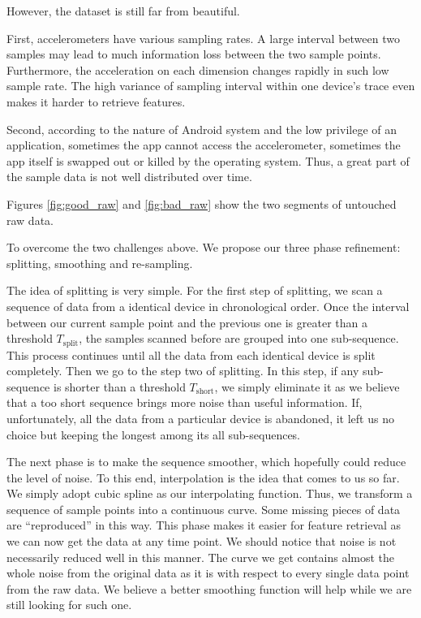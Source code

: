 \documentclass{article} %
\begin{document}
However, the dataset is still far from beautiful.

First, accelerometers have various sampling rates. A large interval between two samples may lead to much information loss between the two sample points. Furthermore, the acceleration on each dimension changes rapidly in such low sample rate. The high variance of sampling interval within one device's trace even makes it harder to retrieve features.

Second, according to the nature of Android system and the low privilege of an application, sometimes the app cannot access the accelerometer, sometimes the app itself is swapped out or killed by the operating system. Thus, a great part of the sample data is not well distributed over time.

Figures \ref{fig:good_raw} and \ref{fig:bad_raw} show the two segments of untouched raw data. 

To overcome the two challenges above. We propose our three phase refinement: splitting, smoothing and re-sampling.

The idea of splitting is very simple. For the first step of splitting, we scan a sequence of data from a identical device in chronological order. Once the interval between our current sample point and the previous one is greater than a threshold $T_\mathrm{split}$, the samples scanned before are grouped into one sub-sequence. This process continues until all the data from each identical device is split completely. Then we go to the step two of splitting. In this step, if any sub-sequence is shorter than a threshold $T_\mathrm{short}$, we simply eliminate it as we believe that a too short sequence brings more noise than useful information. If, unfortunately, all the data from a particular device is abandoned, it left us no choice but keeping the longest among its all sub-sequences.

The next phase is to make the sequence smoother, which hopefully could reduce the level of noise. To this end, interpolation is the idea that comes to us so far. We simply adopt cubic spline as our interpolating function. Thus, we transform a sequence of sample points into a continuous curve. Some missing pieces of data are ``reproduced'' in this way. This phase makes it easier for feature retrieval as we can now get the data at any time point. We should notice that noise is not necessarily reduced well in this manner. The curve we get contains almost the whole noise from the original data as it is with respect to every single data point from the raw data. We believe a better smoothing function will help while we are still looking for such one.
\end{document}
